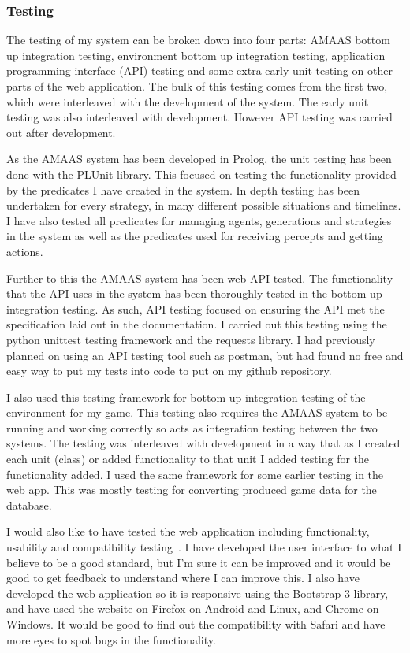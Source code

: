 \documentclass[]{final_report}
\begin{document}
\subsubsection{Testing}
The testing of my system can be broken down into four parts: AMAAS bottom up integration testing, environment bottom up integration testing, application programming interface (API) testing and some extra early unit testing on other parts of the web application. The bulk of this testing comes from the first two, which were interleaved with the development of the system. The early unit testing was also interleaved with development. However API testing was carried out after development.\par 
As the AMAAS system has been developed in Prolog, the unit testing has been done with the PLUnit library. This focused on testing the functionality provided by the predicates I have created in the system. In depth testing has been undertaken for every strategy, in many different possible situations and timelines. I have also tested all predicates for managing agents, generations and strategies in the system as well as the predicates used for receiving percepts and getting actions.\par 
Further to this the AMAAS system has been web API tested. The functionality that the API uses in the system has been thoroughly tested in the bottom up integration testing. As such, API testing focused on ensuring the API met the specification laid out in the documentation. I carried out this testing using the python unittest testing framework and the requests library. I had previously planned on using an API testing tool such as postman, but had found no free and easy way to put my tests into code to put on my github repository.\par 
I also used this testing framework for bottom up integration testing of the environment for my game. This testing also requires the AMAAS system to be running and working correctly so acts as integration testing between the two systems. The testing was interleaved with development in a way that as I created each unit (class) or added functionality to that unit I added testing for the functionality added. I used the same framework for some earlier testing in the web app. This was mostly testing for converting produced game data for the database.\par 
I would also like to have tested the web application including functionality, usability and compatibility testing~\cite{guru99_testing, software_testing_help}. I have developed the user interface to what I believe to be a good standard, but I'm sure it can be improved and it would be good to get feedback to understand where I can improve this. I also have developed the web application so it is responsive using the Bootstrap 3 library, and have used the website on Firefox on Android and Linux, and Chrome on Windows. It would be good to find out the compatibility with Safari and have more eyes to spot bugs in the functionality.
\end{document}
